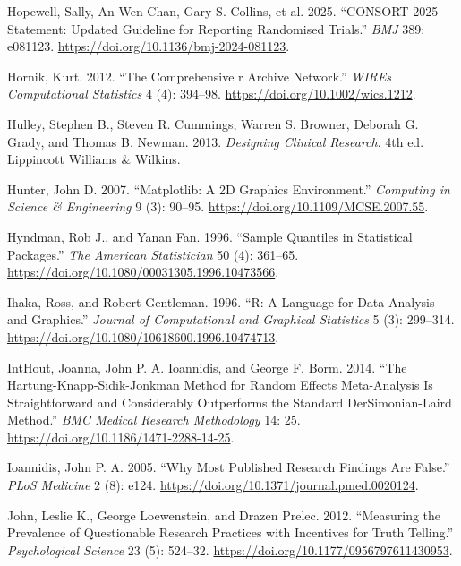 \documentclass[
]{book}
\newlength{\cslhangindent}
\newenvironment{CSLReferences}[2] %
 {\begin{list}{}{%
  \setlength{\itemindent}{0pt}
  \setlength{\leftmargin}{0pt}
  \setlength{\parsep}{0pt}
  \ifodd #1
   \setlength{\leftmargin}{\cslhangindent}
   \setlength{\itemindent}{-1\cslhangindent}
  \fi
  \setlength{\itemsep}{#2\baselineskip}}}
 {\end{list}}
\begin{document}
\begin{CSLReferences}{1}{1}
{Hopewell, Sally, An-Wen Chan, Gary S. Collins, et al.} 2025. {``{CONSORT} 2025 Statement: Updated Guideline for Reporting Randomised Trials.''} \emph{BMJ} 389: e081123. \url{https://doi.org/10.1136/bmj-2024-081123}.

Hornik, Kurt. 2012. {``The Comprehensive r Archive Network.''} \emph{WIREs Computational Statistics} 4 (4): 394--98. \url{https://doi.org/10.1002/wics.1212}.

Hulley, Stephen B., Steven R. Cummings, Warren S. Browner, Deborah G. Grady, and Thomas B. Newman. 2013. \emph{Designing Clinical Research}. 4th ed. Lippincott Williams \& Wilkins.

Hunter, John D. 2007. {``Matplotlib: A {2D} Graphics Environment.''} \emph{Computing in Science \& Engineering} 9 (3): 90--95. \url{https://doi.org/10.1109/MCSE.2007.55}.

Hyndman, Rob J., and Yanan Fan. 1996. {``Sample Quantiles in Statistical Packages.''} \emph{The American Statistician} 50 (4): 361--65. \url{https://doi.org/10.1080/00031305.1996.10473566}.

Ihaka, Ross, and Robert Gentleman. 1996. {``R: A Language for Data Analysis and Graphics.''} \emph{Journal of Computational and Graphical Statistics} 5 (3): 299--314. \url{https://doi.org/10.1080/10618600.1996.10474713}.

IntHout, Joanna, John P. A. Ioannidis, and George F. Borm. 2014. {``The {Hartung-Knapp-Sidik-Jonkman} Method for Random Effects Meta-Analysis Is Straightforward and Considerably Outperforms the Standard {DerSimonian-Laird} Method.''} \emph{BMC Medical Research Methodology} 14: 25. \url{https://doi.org/10.1186/1471-2288-14-25}.

Ioannidis, John P. A. 2005. {``Why Most Published Research Findings Are False.''} \emph{PLoS Medicine} 2 (8): e124. \url{https://doi.org/10.1371/journal.pmed.0020124}.

John, Leslie K., George Loewenstein, and Drazen Prelec. 2012. {``Measuring the Prevalence of Questionable Research Practices with Incentives for Truth Telling.''} \emph{Psychological Science} 23 (5): 524--32. \url{https://doi.org/10.1177/0956797611430953}.


\end{CSLReferences}
\end{document}
